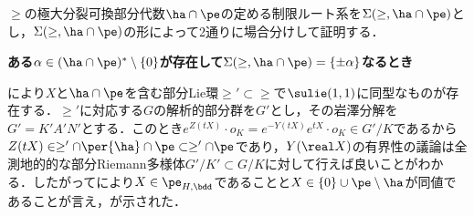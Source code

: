 \begin{npfwn}%
  $\ge$の極大分裂可換部分代数$\ha\cap\pe$の定める制限ルート系を$\Sigma(\ge,\ha\cap\pe) $とし，$\Sigma(\ge,\ha\cap\pe) $の形によって2通りに場合分けして証明する．
  
  \textbf{ある$\alpha\in (\ha\cap\pe)^{*}\setminus\{0\} $が存在して$\Sigma(\ge,\ha\cap\pe) = \{\pm\alpha \}$なるとき}
  
  により$X$と$\ha\cap\pe $を含む部分Lie環$\ge' \subset \ge $で$\sulie(1,1) $に同型なものが存在する．$\ge' $に対応する$G$の解析的部分群を$G'$とし，その岩澤分解を$G' = K'A'N' $とする．このとき$e^{Z(t X)}\cdot o_K = e^{-Y(tX)}e^{tX}\cdot o_K\in G'/K $であるから$Z(tX)\in \ge'\cap \per{\ha}\cap \pe\subset \ge'\cap\pe $であり，$Y(\real X) $の有界性の議論は全測地的的な部分Riemann多様体$G'/K'\subset G/K$に対して行えば良いことがわかる．したがってにより$X\in\pe_{H,\bdd}$であることと$ X \in\{0\}\cup \pe\setminus\ha $が同値であることが言え，が示された．
  

  
  
  


\end{npfwn}
